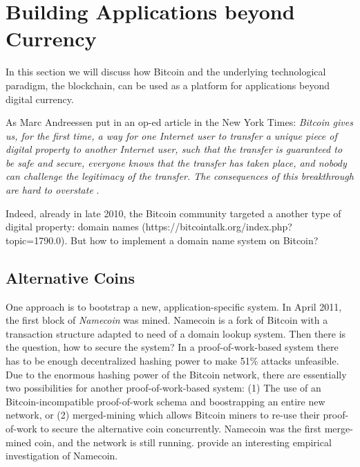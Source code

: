 


\section{Building Applications beyond Currency}
\label{sec:apps_beyond_currency}

In this section we will discuss how Bitcoin and the underlying technological paradigm, the blockchain, can be used as a platform for applications beyond digital currency. 



As Marc Andreessen put in an op-ed article in the New York Times: \emph{Bitcoin gives us, for the first time, a way for one Internet user to transfer a unique piece of digital property to another Internet user, such that the transfer is guaranteed to be safe and secure, everyone knows that the transfer has taken place, and nobody can challenge the legitimacy of the transfer. The consequences of this breakthrough are hard to overstate} \cite{andreessen2014}.

Indeed, already in late 2010, the Bitcoin community targeted a another type of digital property: domain names (https://bitcointalk.org/index.php?topic=1790.0). But how to implement a domain name system on Bitcoin?

\subsection{Alternative Coins}
One approach is to bootstrap a new, application-specific system. In April 2011, the first block of \emph{Namecoin} was mined. Namecoin is a fork of Bitcoin with a transaction structure adapted to need of a domain lookup system. Then there is the question, how to secure the system? In a proof-of-work-based system there has to be enough decentralized hashing power to make 51\% attacks unfeasible. Due to the enormous hashing power of the Bitcoin network, there are essentially two possibilities for another proof-of-work-based system: (1) The use of an Bitcoin-incompatible proof-of-work schema and boostrapping an entire new network, or (2) merged-mining which allows Bitcoin miners to re-use their proof-of-work to secure the alternative coin concurrently. 
Namecoin was the first merge-mined coin, and the network is still running. \cite{kalodner2015empirical} provide an interesting empirical investigation of Namecoin. 

